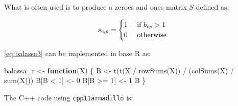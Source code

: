 \documentclass[12pt]{article}
\newenvironment{Shaded}{\begin{snugshade}}{\end{snugshade}}
\newcommand{\ControlFlowTok}[1]{\textcolor[rgb]{0.00,0.23,0.31}{\textbf{#1}}}
\newcommand{\DecValTok}[1]{\textcolor[rgb]{0.68,0.00,0.00}{#1}}
\newcommand{\FunctionTok}[1]{\textcolor[rgb]{0.28,0.35,0.67}{#1}}
\newcommand{\NormalTok}[1]{\textcolor[rgb]{0.00,0.23,0.31}{#1}}
\newcommand{\OtherTok}[1]{\textcolor[rgb]{0.00,0.23,0.31}{#1}}
\newcommand{\SpecialCharTok}[1]{\textcolor[rgb]{0.37,0.37,0.37}{#1}}
\begin{document}
What is often used is to produce a zeroes and ones matrix \(S\) defined
as:

\begin{equation}
\label{eq:balassa3}
s_{c,p} = \begin{cases}1 & \text{ if } b_{cp} > 1\cr 0 & \text{ otherwise} \end{cases}
\end{equation}

\eqref{eq:balassa3} can be implemented in base R as:

\begin{Shaded}
\begin{Highlighting}[]
\NormalTok{balassa\_r }\OtherTok{\textless{}{-}} \ControlFlowTok{function}\NormalTok{(X) \{}
\NormalTok{  B }\OtherTok{\textless{}{-}} \FunctionTok{t}\NormalTok{(}\FunctionTok{t}\NormalTok{(X }\SpecialCharTok{/} \FunctionTok{rowSums}\NormalTok{(X)) }\SpecialCharTok{/}\NormalTok{ (}\FunctionTok{colSums}\NormalTok{(X) }\SpecialCharTok{/} \FunctionTok{sum}\NormalTok{(X)))}
\NormalTok{  B[B }\SpecialCharTok{\textless{}} \DecValTok{1}\NormalTok{] }\OtherTok{\textless{}{-}} \DecValTok{0}
\NormalTok{  B[B }\SpecialCharTok{\textgreater{}=} \DecValTok{1}\NormalTok{] }\OtherTok{\textless{}{-}} \DecValTok{1}
\NormalTok{  B}
\NormalTok{\}}
\end{Highlighting}
\end{Shaded}

The C++ code using \texttt{cpp11armadillo} is:
\end{document}
